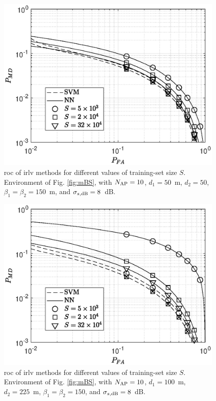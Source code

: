 \documentclass[draftcls,journal,onecolumn]{IEEEtran}
\begin{document}
\begin{figure}[t]
    \centering
    \includegraphics[width=\columnwidth]{res_training_10BS_2Class.eps}
    \caption{\ac{roc} of \ac{irlv} methods for different values of training-set size $S$. Environment of Fig. \ref{fig:mBS}, with  $N_{\rm AP}=10$, $d_1 = 50$~m, $d_2 = 50$, $\beta_1 = \beta_2 = 150$~m, and $\sigma_{s,{\rm dB}} = 8$~dB.}
    \label{fig:kf1}
\end{figure}


\begin{figure}[t]
    \centering
    \includegraphics[width=\columnwidth]{res_training_10BS_2Class_newArea.eps}
    \caption{\ac{roc} of \ac{irlv} methods for different values of training-set size $S$. Environment of Fig. \ref{fig:mBS}, with  $N_{\rm AP}=10$, $d_1 = 100$~m, $d_2 = 225$~m, $\beta_1 = \beta_2 = 150$, and $\sigma_{s,{\rm dB}} = 8$~dB.}
    \label{fig:kf1_newArea}
\end{figure}
\end{document}
